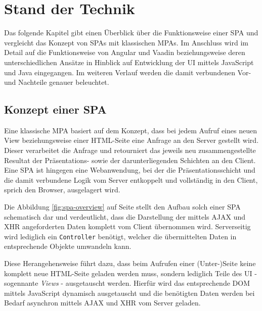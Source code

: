 \documentclass[a4paper,12pt,twoside]{scrreprt}
\begin{document}
\chapter{Stand der Technik}
\label{chap:stand-techni
k}
Das folgende Kapitel gibt einen Überblick über die Funktionsweise einer \acl{SPA} und vergleicht das Konzept von \acsp{SPA} mit klassischen \aclp{MPA}. Im Anschluss wird im Detail auf die Funktionsweise von Angular und Vaadin beziehungsweise deren unterschiedlichen Ansätze in Hinblick auf Entwicklung der \acs{UI} mittels JavaScript und Java eingegangen. Im weiteren Verlauf werden die damit verbundenen Vor- und Nachteile genauer beleuchtet.

\section{Konzept einer \acl{SPA}}
\label{sec:konzept-spa}
Eine klassische \acl{MPA} basiert auf dem Konzept, dass bei jedem Aufruf eines neuen View beziehungsweise einer HTML-Seite eine Anfrage an den Server gestellt wird. Dieser verarbeitet die Anfrage und retourniert das jeweils neu zusammengestellte Resultat der Präsentations- sowie der darunterliegenden Schichten an den Client. Eine \acl{SPA} ist hingegen eine Webanwendung, bei der die Präsentationsschicht und die damit verbundene Logik vom Server entkoppelt und vollständig in den Client, sprich den Browser, ausgelagert wird. \parencite[][Seite 5ff.]{scott_spa_2015}

Die Abbildung \ref{fig:spa-overview} auf Seite \pageref{fig:spa-overview} stellt den Aufbau solch einer \acs{SPA} schematisch dar und verdeutlicht, dass die Darstellung der mittels \acs{AJAX} und XHR angeforderten Daten komplett vom Client übernommen wird. Serverseitig wird lediglich ein \texttt{Controller} benötigt, welcher die übermittelten Daten in entsprechende Objekte umwandeln kann.

\medskip

Diese Herangehensweise führt dazu, dass beim Aufrufen einer (Unter-)Seite keine komplett neue HTML-Seite geladen werden muss, sondern lediglich Teile des \acl{UI} - sogennante \textit{Views} - ausgetauscht werden. Hierfür wird das entsprechende \ac{DOM} mittels JavaScript dynamisch ausgetauscht und die benötigten Daten werden bei Bedarf asynchron mittels \acs{AJAX} und XHR vom Server geladen. \parencite[][Seite 7]{scott_spa_2015}
\end{document}
